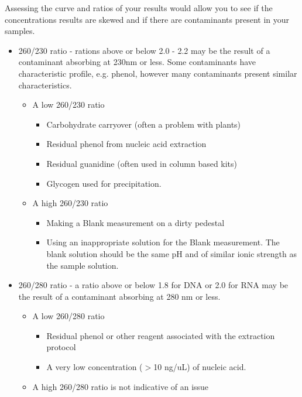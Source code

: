 \documentclass[11pt, oneside]{article}
\begin{document}
	
		\noindent Assessing the curve and ratios of your results would allow you to see if the concentrations results are skewed and if there are 				contaminants present in your samples. 

		\begin{itemize}
			\item 260/230 ratio - rations above or below 2.0 - 2.2  may be the result of a contaminant absorbing at 230nm or less. Some contaminants 			have characteristic profile, e.g. phenol, however many contaminants present similar characteristics. 
			\begin{itemize}
				\item A low 260/230 ratio
				\begin{itemize}
					\item Carbohydrate carryover (often a problem with plants)
					\item Residual phenol from nucleic acid extraction
					\item Residual guanidine (often used in column based kits)
					\item Glycogen used for precipitation. 
				\end{itemize}
				\item A high 260/230 ratio
				\begin{itemize}
					\item Making a Blank measurement on a dirty pedestal
					\item Using an inappropriate solution for the Blank measurement. The blank solution should be the same pH and of similar ionic 					strength as the sample solution.
				\end{itemize} 
			\end{itemize}
			\item 260/280 ratio - a ratio above or below 1.8 for DNA or 2.0 for RNA may be the result of a contaminant absorbing at 280 nm or less. 
			\begin{itemize}
				\item A low 260/280 ratio
				\begin{itemize}
					\item Residual phenol or other reagent associated with the extraction protocol
					\item A very low concentration ($>$10 ng/uL) of nucleic acid. 
				\end{itemize}
				\item A high 260/280 ratio is not indicative of an issue
			\end{itemize}
		\end{itemize}
\end{document}

